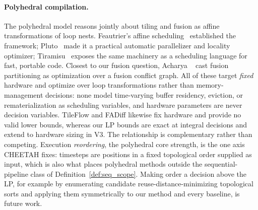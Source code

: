 \paragraph{Polyhedral compilation.}
The polyhedral model reasons jointly about tiling and fusion as affine transformations of loop nests. Feautrier's affine scheduling~\citep{feautrier1992affine} established the framework; Pluto~\citep{bondhugula2008pluto} made it a practical automatic parallelizer and locality optimizer; Tiramisu~\citep{baghdadi2019tiramisu} exposes the same machinery as a scheduling language for fast, portable code. Closest to our fusion question, Acharya \etal~\citep{acharya2020fusion} cast fusion partitioning as optimization over a fusion conflict graph. All of these target \emph{fixed} hardware and optimize over loop transformations rather than memory-management decisions: none model time-varying buffer residency, eviction, or rematerialization as scheduling variables, and hardware parameters are never decision variables. TileFlow and FADiff likewise fix hardware and provide no valid lower bounds, whereas our LP bounds are exact at integral decisions and extend to hardware sizing in V3. The relationship is complementary rather than competing. Execution \emph{reordering}, the polyhedral core strength, is the one axis CHEETAH fixes: timesteps are positions in a fixed topological order supplied as input, which is also what places polyhedral methods outside the sequential-pipeline class of Definition~\ref{def:seq_scope}. Making order a decision above the LP, for example by enumerating candidate reuse-distance-minimizing topological sorts and applying them symmetrically to our method and every baseline, is future work.


